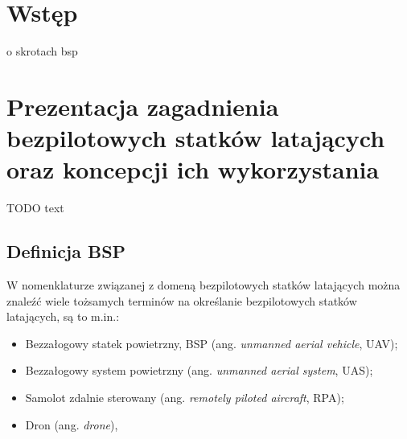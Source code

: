

\newcommand{\kierunek}{INFORMATYKA}
\newcommand{\stopien}{STUDIA II$^{\mathrm{o}}$} %
\newcommand{\temat}{MOBILNY SYSTEM ZARZĄDZANIA I STEROWANIA BEZPILOTOWYM STATKIEM LATAJĄCYM}
\newcommand{\data}{Warszawa 2022}
\newcommand{\autor}{Norbert WASZKOWIAK}
\newcommand{\promotor}{dr inż. Michał DYK}
\newcommand{\zgoda}{TAK} %
\newcommand{\specjalnosc}{SYSTEMY INFORMATYCZNE}
\newcommand{\bibTitle}[1]{``#1''}





\inserttitlepage

\section*{Wstęp} 
    
     o skrotach bsp
\clearpage

\section{Prezentacja zagadnienia bezpilotowych statków latających oraz koncepcji ich wykorzystania}
\hspace{1cm}TODO text

\subsection{Definicja BSP}
\hspace{1cm}W nomenklaturze związanej z domeną bezpilotowych statków latających można znaleźć wiele tożsamych terminów na określanie bezpilotowych statków latających, są to m.in.:
\begin{itemize}
  \item Bezzałogowy statek powietrzny, BSP (ang. \textit{unmanned aerial vehicle}, UAV);
  \item Bezzałogowy system powietrzny (ang. \textit{unmanned aerial system}, UAS);
  \item Samolot zdalnie sterowany (ang. \textit{remotely piloted aircraft}, RPA);
  \item Dron (ang. \textit{drone}),
\end{itemize}

